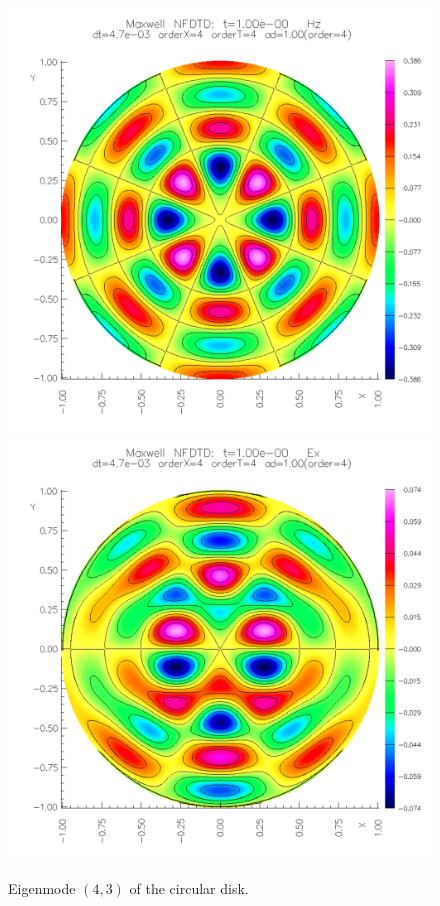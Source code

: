 \renewcommand{\figWidth}{.45\linewidth}
\begin{figure}
\begin{center}
\includegraphics[width=\figWidth]{figures/diskEigenMode43Hz}
\includegraphics[width=\figWidth]{figures/diskEigenMode43Ex}
\end{center}
\caption{Eigenmode $(4,3)$ of the circular disk.}
\end{figure}

